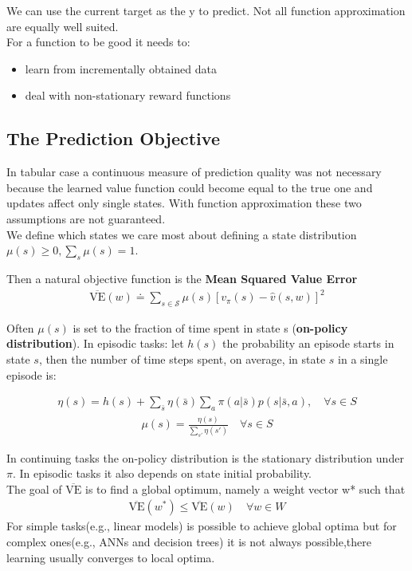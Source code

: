 We can use the current target as the y to predict. Not all function approximation are equally well suited.\\

For a function to be good it needs to:
\begin{itemize}
    \item learn from incrementally obtained data
    \item deal with non-stationary reward functions
\end{itemize}
\subsection{The Prediction Objective}
In tabular case a continuous measure of prediction quality was not necessary because the learned value function could become equal to the true one and updates affect only single states.
With function approximation these two assumptions are not guaranteed.\\

We define which states we care most about defining a state distribution $\mu(s)\ge0,\sum_s\mu(s)=1$.

Then a natural objective function is the \textbf{Mean Squared Value Error}
\begin{align}
    \overline{\mbox{VE}}(w)\doteq\sum_{s\in\mathcal{S}}\mu(s)[v_\pi(s)-\hat{v}(s, w)]^2
\end{align}

Often $\mu(s)$ is set to the fraction of time spent in state s (\textbf{on-policy
distribution}).
In episodic tasks: let $h(s)$ the probability an episode starts in state $s$,
then the number of time steps spent, on average, in state $s$ in a
single episode is:

\begin{align}
    \eta(s)=h(s)+\sum_{\bar{s}}\eta(\bar{s})\sum_a\pi(a | \bar{s})p(s | \bar{s},a),\quad\forall s\in S
\end{align}
\begin{align}
    \mu(s)=\frac{\eta(s)}{\sum_{s'}\eta(s')}\quad\forall s\in S
\end{align}

In continuing tasks the on-policy distribution is the stationary
distribution under $\pi$. In episodic tasks it also depends on state initial
probability.\\


The goal of $\overline{\mbox{VE}}$ is to find a global optimum, namely a weight vector w* such that
\begin{align}
    \overline{\mbox{VE}}(w^*)\leq \overline{\mbox{VE}}(w)\quad \forall w\in W
\end{align}
For simple tasks(e.g., linear
models) is possible to achieve global optima but for complex ones(e.g., ANNs and decision trees) it is not always possible,there learning usually converges to local optima.
